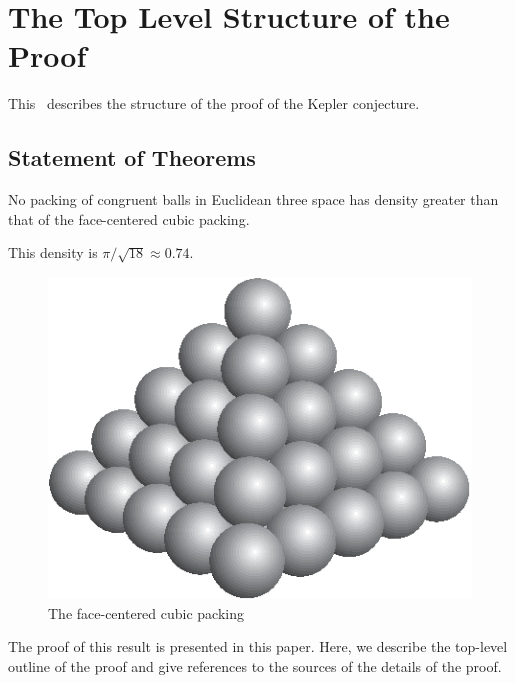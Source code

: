 
\chapter{The Top Level Structure of the Proof}

\label{sec:overview}

This \chap\ describes the structure of the proof of the
 Kepler conjecture.

\section{Statement of Theorems}\label{sec:statement}


\begin{theorem}
\label{theorem:kepler}   No packing of congruent balls in
Euclidean three space has density greater than that of the
face-centered cubic packing.
\end{theorem}

This density is $\pi/\sqrt{18}\approx 0.74.$

\begin{figure}[htb]
  \centering
  \includegraphics{PS/fcc_small.eps}
  \caption{The face-centered cubic packing}
  \label{fig:fcc}
\end{figure}


The proof of this result is presented in this paper. Here, we
describe the top-level outline of the proof and give references to
the sources of the details of the proof.

